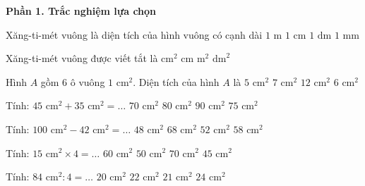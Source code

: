 \textbf{Phần 1. Trắc nghiệm lựa chọn}

\begin{ex} %
Xăng-ti-mét vuông là diện tích của hình vuông có cạnh dài
\choice
{$1\text{ m}$}
{\True $1\text{ cm}$}
{$1\text{ dm}$}
{$1\text{ mm}$}
\end{ex}

\begin{ex} %
Xăng-ti-mét vuông được viết tắt là
\choice
{\True $\text{cm}^2$}
{$\text{cm}$}
{$\text{m}^2$}
{$\text{dm}^2$}
\end{ex}

\begin{ex} %
Hình $A$ gồm 6 ô vuông $1\text{ cm}^2$. Diện tích của hình $A$ là
\choice
{$5\text{ cm}^2$}
{$7\text{ cm}^2$}
{$12\text{ cm}^2$}
{\True $6\text{ cm}^2$}
\end{ex}

\begin{ex} %
Tính: $45\text{ cm}^2 + 35\text{ cm}^2 = \dots$
\choice
{$70\text{ cm}^2$}
{\True $80\text{ cm}^2$}
{$90\text{ cm}^2$}
{$75\text{ cm}^2$}
\end{ex}

\begin{ex} %
Tính: $100\text{ cm}^2 - 42\text{ cm}^2 = \dots$
\choice
{$48\text{ cm}^2$}
{$68\text{ cm}^2$}
{$52\text{ cm}^2$}
{\True $58\text{ cm}^2$}
\end{ex}

\begin{ex} %
Tính: $15\text{ cm}^2 \times 4 = \dots$
\choice
{\True $60\text{ cm}^2$}
{$50\text{ cm}^2$}
{$70\text{ cm}^2$}
{$45\text{ cm}^2$}
\end{ex}

\begin{ex} %
Tính: $84\text{ cm}^2 : 4 = \dots$
\choice
{$20\text{ cm}^2$}
{$22\text{ cm}^2$}
{\True $21\text{ cm}^2$}
{$24\text{ cm}^2$}
\end{ex}

